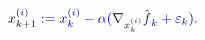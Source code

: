 \documentclass[12pt]{article}
\begin{document}
\makeatletter
\renewcommand*{\@textcolor}[3]{%
  \protect\leavevmode
  \begingroup
    \color#1{#2}#3%
  \endgroup
}
\makeatother
\begin{displaymath}
\mathcolor[RGB]{0,0,15}{x} _ { \mathcolor[RGB]{0,0,30}{k} \mathcolor[RGB]{0,0,45}{+} \mathcolor[RGB]{0,0,60}{1} } ^ { \mathcolor[RGB]{0,0,75}{(} \mathcolor[RGB]{0,0,90}{i} \mathcolor[RGB]{0,0,105}{)} } \mathcolor[RGB]{0,0,120}{:} \mathcolor[RGB]{0,0,135}{=} \mathcolor[RGB]{0,0,150}{x} _ { \mathcolor[RGB]{0,0,165}{k} } ^ { \mathcolor[RGB]{0,0,180}{(} \mathcolor[RGB]{0,0,195}{i} \mathcolor[RGB]{0,0,210}{)} } \mathcolor[RGB]{0,0,225}{-} \mathcolor[RGB]{0,0,240}{\alpha} \mathcolor[RGB]{0,0,255}{(} \mathcolor[RGB]{0,15,0}{\nabla} _ { \mathcolor[RGB]{0,15,15}{x} _ { \mathcolor[RGB]{0,15,30}{k} } ^ { \mathcolor[RGB]{0,15,45}{(} \mathcolor[RGB]{0,15,60}{i} \mathcolor[RGB]{0,15,75}{)} } } {\mathcolor[RGB]{0,15,90}{\hat { \mathcolor[RGB]{0,15,105}{f} } }} _ { \mathcolor[RGB]{0,15,120}{k} } \mathcolor[RGB]{0,15,135}{+} \mathcolor[RGB]{0,15,150}{\varepsilon} _ { \mathcolor[RGB]{0,15,165}{k} } \mathcolor[RGB]{0,15,180}{)} \mathcolor[RGB]{0,15,195}{.}
\end{displaymath}
\end{document}
